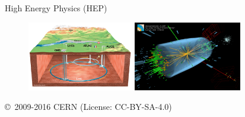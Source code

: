 \documentclass[final]{beamer}
\begin{document}
\begin{frame}{}
\begin{textblock}{38.0}
\begin{block}{High Energy Physics (HEP)}
\begin{figure}[tbph]
\centering
\includegraphics[width=0.41\textwidth]{images/CERN-LHC-cutaway-view-medium.png}
\includegraphics[width=0.42\textwidth]{images/eemm_run195099_evt137440354_ispy_3d-annotated-2.png}
\end{figure}
{\small \copyright~2009-2016 CERN (License: CC-BY-SA-4.0)}
\end{block}
\end{textblock}




\end{frame}
\end{document}
